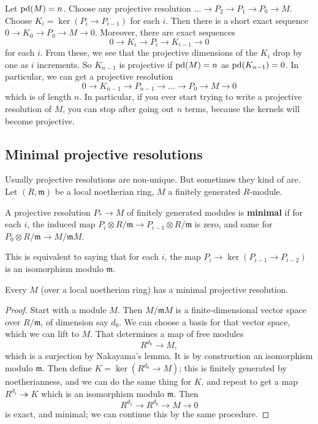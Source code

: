 Let $\mathrm{pd}(M) = n$. Choose any projective resolution $\dots \to
P_2 \to P_1 \to
P_0 \to M$. Choose $K_i = \ker(P_i \to P_{i-1})$ for each $i$.
Then there is a short exact sequence $0 \to K_0 \to P_0 \to M
\to 0$. Moreover,
there are exact sequences
\[ 0 \to K_i \to P_i \to K_{i-1} \to 0  \]
for each $i$. From these, we see that the projective dimensions
of the $K_i$
drop by one as $i$ increments. So $K_{n-1}$ is projective if
$\mathrm{pd}(M) = n$ as
$\mathrm{pd}(K_{n-1})=0$. In particular, we can get a projective
resolution
\[ 0 \to K_{n-1} \to P_{n-1} \to \dots \to P_0 \to M \to 0  \]
which is of length $n$.
In particular, if you ever start trying to write a projective
resolution of
$M$, you can stop after going out $n$ terms, because the kernels
will become
projective.


\subsection{Minimal projective resolutions}
Usually projective resolutions are non-unique. But sometimes
they kind of are.
Let $(R, \mathfrak{m})$ be a local noetherian ring, $M$ a
finitely generated $R$-module.

\begin{definition}
A projective resolution $P_* \to M$ of finitely generated
modules is \textbf{minimal} if for each $i$, the
induced map $P_i \otimes R/\mathfrak{m} \to P_{i-1} \otimes
R/\mathfrak{m}$ is
zero, and same for $P_0 \otimes R/\mathfrak{m} \to
M/\mathfrak{m}M$.
\end{definition}

This is equivalent to saying that for each $i$, the map $P_i
\to\ker(P_{i-1}
\to P_{i-2})$ is an isomorphism modulo $\mathfrak{m}$.

\begin{proposition}
Every $M$ (over a local noetherian ring) has a minimal
projective resolution.
\end{proposition}
\begin{proof}
Start with a module $M$. Then $M/\mathfrak{m}M$ is a
finite-dimensional vector
space over $R/\mathfrak{m}$, of dimension say $d_0$. We can
choose a basis for that vector space, which
we can lift to $M$. That determines a map of free modules
\[ R^{d_0} \to M,  \]
which is a surjection by Nakayama's lemma. It is by construction
an
isomorphism modulo $\mathfrak{m}$. Then define $K =
\ker(R^{d_0}\to M)$; this
is finitely generated by noetherianness, and we
can do the same thing for $K$, and repeat to get a map $R^{d_1}
\twoheadrightarrow K$ which is an isomorphism modulo
$\mathfrak{m}$. Then
\[ R^{d_1} \to R^{d_0} \to M \to 0  \]
is exact, and minimal; we can continue this by the same
procedure.
\end{proof}


